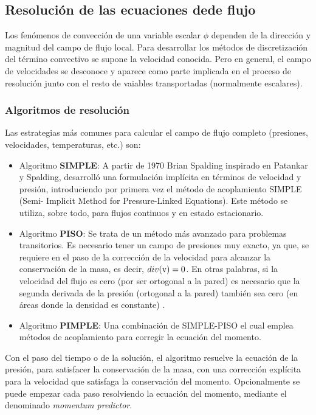 \subsection{Resolución de las ecuaciones dede flujo}\label{header-n407}

Los fenómenos de convección de una variable escalar \(\phi\) dependen de
la dirección y magnitud del campo de flujo local. Para desarrollar los
métodos de discretización del término convectivo se supone la velocidad
conocida. Pero en general, el campo de velocidades se desconoce y
aparece como parte implicada en el proceso de resolución junto con el
resto de vaiables transportadas (normalmente escalares).

\subsubsection{Algoritmos de resolución}\label{header-n412}

Las estrategias más comunes para calcular el campo de flujo completo
(presiones, velocidades, temperaturas, etc.) son:

\begin{itemize}
\item
  Algoritmo \textbf{SIMPLE}: A partir de 1970 Brian Spalding inspirado
  en Patankar y Spalding, desarrolló una formulación implícita en
  términos de velocidad y presión, introduciendo por primera vez el
  método de acoplamiento SIMPLE (Semi- Implicit Method for
  Pressure-Linked Equations). Este método se utiliza, sobre todo, para
  flujos continuos y en estado estacionario.
\item
  Algoritmo \textbf{PISO}: Se trata de un método más avanzado para
  problemas transitorios. Es necesario tener un campo de presiones muy
  exacto, ya que, se requiere en el paso de la corrección de la
  velocidad para alcanzar la conservación de la masa, es decir,
  \(div(\text v)=0\). En otras palabras, si la velocidad del flujo es
  cero (por ser ortogonal a la pared) es necesario que la segunda
  derivada de la presión (ortogonal a la pared) también sea cero (en
  áreas donde la densidad es constante) \cite{solution}.
\item
  Algoritmo \textbf{PIMPLE}: Una combinación de SIMPLE-PISO el cual
  emplea métodos de acoplamiento para corregir la ecuación del momento.
\end{itemize}

Con el paso del tiempo o de la solución, el algoritmo resuelve la
ecuación de la presión, para satisfacer la conservación de la masa, con
una corrección explícita para la velocidad que satisfaga la conservación
del momento. Opcionalmente se puede empezar cada paso resolviendo la
ecuación del momento, mediante el denominado \emph{momentum predictor}.

